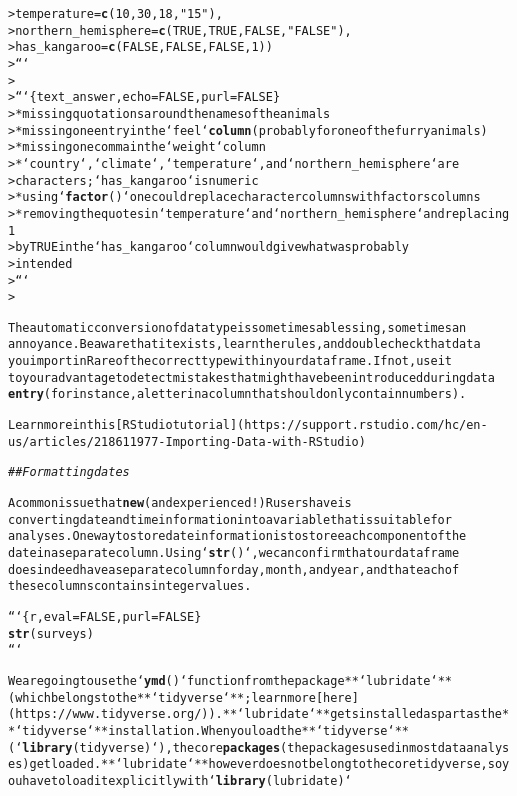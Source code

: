 \documentclass{article}\usepackage[]{graphicx}\usepackage[]{xcolor}
\makeatletter
\newcommand{\hlstr}[1]{\textcolor[rgb]{0.192,0.494,0.8}{#1}}%
\newcommand{\hlcom}[1]{\textcolor[rgb]{0.678,0.584,0.686}{\textit{#1}}}%
\newcommand{\hlkwd}[1]{\textcolor[rgb]{0.737,0.353,0.396}{\textbf{#1}}}%
\newenvironment{kframe}{%
 \def\at@end@of@kframe{}%
 \ifinner\ifhmode%
  \def\at@end@of@kframe{\end{minipage}}%
  \begin{minipage}{\columnwidth}%
 \fi\fi%
 \def\FrameCommand##1{\hskip\@totalleftmargin \hskip-\fboxsep
 \colorbox{shadecolor}{##1}\hskip-\fboxsep
     \hskip-\linewidth \hskip-\@totalleftmargin \hskip\columnwidth}%
 \MakeFramed {\advance\hsize-\width
   \@totalleftmargin\z@ \linewidth\hsize
   \@setminipage}}%
 {\par\unskip\endMakeFramed%
 \at@end@of@kframe}
\newenvironment{knitrout}{}{} %
\makeatother
\begin{document}
\begin{knitrout}
\begin{kframe}
\begin{alltt}
>                                   temperature = \hlkwd{c}(10, 30, 18, \hlstr{"15"}),
>                                   northern_hemisphere = \hlkwd{c}(TRUE, TRUE, FALSE, \hlstr{"FALSE"}),
>                                   has_kangaroo = \hlkwd{c}(FALSE, FALSE, FALSE, 1))
>    ```
>
>    ```\{text_answer, echo=FALSE, purl=FALSE\}
>    * missing quotations around the names of the animals
>    * missing one entry in the `feel` \hlkwd{column} (probably for one of the furry animals)
>    * missing one comma in the `weight` column
>    * `country`, `climate`, `temperature`, and `northern_hemisphere` are
>       characters; `has_kangaroo` is numeric
>    * using `\hlkwd{factor}()` one could replace character columns with factors columns
>    * removing the quotes in `temperature` and `northern_hemisphere` and replacing 1
>      by TRUE in the `has_kangaroo` column would give what was probably 
>      intended
>    ```
>

The automatic conversion of data type is sometimes a blessing, sometimes an
annoyance. Be aware that it exists, learn the rules, and double check that data
you import in R are of the correct type within your data frame. If not, use it
to your advantage to detect mistakes that might have been introduced during data
\hlkwd{entry} (for instance, a letter in a column that should only contain numbers).

Learn more in this [RStudio tutorial](https://support.rstudio.com/hc/en-us/articles/218611977-Importing-Data-with-RStudio)

\hlcom{## Formatting dates}

A common issue that \hlkwd{new} (and experienced!) R users have is
converting date and time information into a variable that is suitable for 
analyses. One way to store date information is to store each component of the 
date in a separate column. Using `\hlkwd{str}()`, we can confirm that our data frame 
does indeed have a separate column for day, month, and year, and that each of 
these columns contains integer values.

```\{r, eval=FALSE, purl=FALSE\}
\hlkwd{str}(surveys)
```

We are going to use the `\hlkwd{ymd}()` function from the package **`lubridate`** (which belongs to the **`tidyverse`**; learn more [here](https://www.tidyverse.org/)). **`lubridate`** gets installed as part as the **`tidyverse`** installation. When you load  the **`tidyverse`** (`\hlkwd{library}(tidyverse)`), the core \hlkwd{packages} (the packages used in most data analyses) get loaded. **`lubridate`** however does not belong to the core tidyverse, so you have to load it explicitly with `\hlkwd{library}(lubridate)`


\end{alltt}
\end{kframe}
\end{knitrout}
\end{document}
